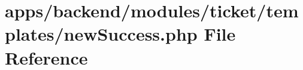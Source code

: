 \hypertarget{backend_2modules_2ticket_2templates_2new_success_8php}{\section{apps/backend/modules/ticket/templates/new\-Success.php File Reference}
\label{backend_2modules_2ticket_2templates_2new_success_8php}
}
